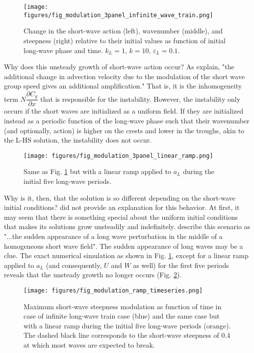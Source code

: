 \documentclass[lineno]{jfm}
\begin{document}
\begin{figure}
\centering
\texttt{[image: figures/fig\_modulation\_3panel\_infinite\_wave\_train.png]}
\caption{
  Change in the short-wave action (left), wavenumber (middle), and steepness (right)
  relative to their initial values as function of initial long-wave phase and time.
  $k_L = 1$, $k = 10$, $\varepsilon_L = 0.1$.
}
\label{fig:modulation_3panel_infinite}
\end{figure}

Why does this unsteady growth of short-wave action occur?
As \citet{peureux2021unsteady} explain, "the additional change in advection
velocity due to the modulation of the short wave group speed gives an additional
amplification."
That is, it is the inhomogeneity term $N \dfrac{\partial C_g}{\partial x}$ that
is responsible for the instability.
However, the instability only occurs if the short waves are initialized as a
uniform field.
If they are initialized instead as a periodic function of the long-wave phase
such that their wavenumber (and optionally, action) is higher on the crests
and lower in the troughs, akin to the L-HS solution, the instability does not
occur.

\begin{figure}
\centering
\texttt{[image: figures/fig\_modulation\_3panel\_linear\_ramp.png]}
\caption{
  Same as Fig. \ref{fig:modulation_3panel_infinite} but with a linear ramp
  applied to $a_L$ during the initial five long-wave periods.
}
\label{fig:modulation_3panel_ramp}
\end{figure}

Why is it, then, that the solution is so different depending on the short-wave
initial conditions?
\citet{peureux2021unsteady} did not provide an explanation for this behavior.
At first, it may seem that there is something special about the uniform initial
conditions that makes its solutions grow unsteadily and indefinitely.
\citet{peureux2021unsteady} describe this scenario as "...the sudden appearance
of a long wave perturbation in the middle of a homogeneous short wave field".
The sudden appearance of long waves may be a clue.
The exact numerical simulation as shown in Fig. \ref{fig:modulation_3panel_infinite},
except for a linear ramp applied to $a_L$ (and consequently, $U$ and $W$ as well)
for the first five periods reveals that the unsteady growth no longer occurs
(Fig. \ref{fig:modulation_3panel_ramp}).

\begin{figure}
  \centering
  \texttt{[image: figures/fig\_modulation\_ramp\_timeseries.png]}
  \caption{
    Maximum short-wave steepness modulation as function of time in case of
    infinite long-wave train case (blue) and the same case but with a linear
    ramp during the initial five long-wave periods (orange). The dashed black
    line corresponds to the short-wave steepness of 0.4 at which most waves are
    expected to break.
  }
  \label{fig:unsteady_growth_timeseries}
\end{figure}
\end{document}

